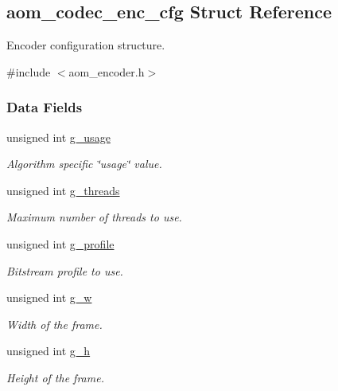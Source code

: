\hypertarget{structaom__codec__enc__cfg}{}\subsection{aom\+\_\+codec\+\_\+enc\+\_\+cfg Struct Reference}
\label{structaom__codec__enc__cfg}


Encoder configuration structure.  




{\ttfamily \#include $<$aom\+\_\+encoder.\+h$>$}

\subsubsection*{Data Fields}
\begin{DoxyCompactItemize}
\item 
unsigned int \hyperlink{structaom__codec__enc__cfg_a2aef2cdcf97e60ab36f7ca77c028e816}{g\+\_\+usage}
\begin{DoxyCompactList}\small\item\em Algorithm specific \char`\"{}usage\char`\"{} value. \end{DoxyCompactList}\item 
unsigned int \hyperlink{structaom__codec__enc__cfg_a55f56f04145e334cfa727df77d8378d4}{g\+\_\+threads}
\begin{DoxyCompactList}\small\item\em Maximum number of threads to use. \end{DoxyCompactList}\item 
unsigned int \hyperlink{structaom__codec__enc__cfg_a715cb435d6eaca88eab71a763af3d8ec}{g\+\_\+profile}
\begin{DoxyCompactList}\small\item\em Bitstream profile to use. \end{DoxyCompactList}\item 
unsigned int \hyperlink{structaom__codec__enc__cfg_a80cb459c5ef3c7e1516f617c4c9d6eab}{g\+\_\+w}
\begin{DoxyCompactList}\small\item\em Width of the frame. \end{DoxyCompactList}\item 
unsigned int \hyperlink{structaom__codec__enc__cfg_a37b0f57b63bec8d133df8901d4407ee6}{g\+\_\+h}
\begin{DoxyCompactList}\small\item\em Height of the frame. \end{DoxyCompactList}\item 

\end{DoxyCompactItemize}
